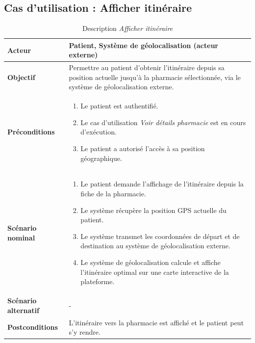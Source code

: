 \documentclass[12pt,a4paper]{report}
\begin{document}
\subsection*{Cas d'utilisation : Afficher itinéraire}

\begin{table}[H]
    \centering
    \begin{tabular}{|p{4cm}|p{9cm}|}
        \hline
        \textbf{Acteur} & Patient, Système de géolocalisation (acteur externe) \\
        \hline
        \textbf{Objectif} & Permettre au patient d'obtenir l'itinéraire depuis sa position actuelle jusqu'à la pharmacie sélectionnée, via le système de géolocalisation externe. \\
        \hline
        \textbf{Préconditions} &
        \begin{enumerate}
            \item Le patient est authentifié.
            \item Le cas d'utilisation \textit{Voir détails pharmacie} est en cours d'exécution.
            \item Le patient a autorisé l'accès à sa position géographique.
        \end{enumerate} \\
        \hline
        \textbf{Scénario nominal} &
        \begin{enumerate}
            \item Le patient demande l'affichage de l'itinéraire depuis la fiche de la pharmacie.
            \item Le système récupère la position GPS actuelle du patient.
            \item Le système transmet les coordonnées de départ et de destination au système de géolocalisation externe.
            \item Le système de géolocalisation calcule et affiche l'itinéraire optimal sur une carte interactive de la plateforme.
        \end{enumerate} \\
        \hline
        \textbf{Scénario alternatif} & - \\
        \hline
        \textbf{Postconditions} & L'itinéraire vers la pharmacie est affiché et le patient peut s'y rendre. \\
        \hline
    \end{tabular}
    \caption{Description \textit{Afficher itinéraire}}
\end{table}
\end{document}
